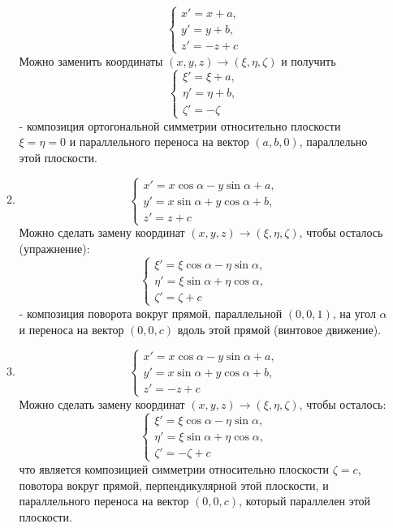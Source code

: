 \begin{itemize}
\begin{enumerate}
        \[
        \begin{cases}
            x'=x+a,\\
            y'=y+b,\\
            z'=-z+c
        \end{cases}
        \]
        Можно заменить координаты  $(x,y,z)\to(\xi, \eta, \zeta)$ и получить 
        \[
        \begin{cases}
            \xi'=\xi+a,\\
            \eta'=\eta+b,\\
            \zeta'=-\zeta
        \end{cases}
        \]
        - композиция ортогональной симметрии относительно плоскости $\xi=\eta=0$ и параллельного переноса на вектор $(a,b,0)$, параллельно этой плоскости.
        \item
        \[
        \begin{cases}
            x'=x\cos{\alpha}-y\sin{\alpha}+a,\\
            y'=x\sin{\alpha}+y\cos{\alpha}+b,\\
            z'=z+c
        \end{cases}
        \]
        Можно сделать замену координат $(x,y,z)\to(\xi, \eta, \zeta)$, чтобы осталось (упражнение):
        \[\begin{cases}
            \xi'=\xi\cos{\alpha}-\eta\sin{\alpha},\\
            \eta'=\xi\sin{\alpha}+\eta\cos{\alpha},\\
            \zeta'=\zeta+c
        \end{cases}
        \]
        - композиция поворота вокруг прямой, параллельной $(0,0,1)$, на угол $\alpha$ и переноса на вектор $(0,0,c)$ вдоль этой прямой (винтовое движение).
        \item
        \[\begin{cases}
            x'=x\cos{\alpha}-y\sin{\alpha}+a,\\
            y'=x\sin{\alpha}+y\cos{\alpha}+b,\\
            z'=-z+c
        \end{cases}
        \]
        Можно сделать замену координат $(x,y,z)\to(\xi, \eta, \zeta)$, чтобы осталось:
        \[
        \begin{cases}
            \xi'=\xi\cos{\alpha}-\eta\sin{\alpha},\\
            \eta'=\xi\sin{\alpha}+\eta\cos{\alpha},\\
            \zeta'=-\zeta+c
        \end{cases}
        \]
        что является композицией симметрии относительно плоскости $\zeta=c$, повотора вокруг прямой, перпендикулярной этой плоскости, и параллельного переноса на вектор $(0,0,c)$, который параллелен этой плоскости.
    \end{enumerate}
\end{itemize}


